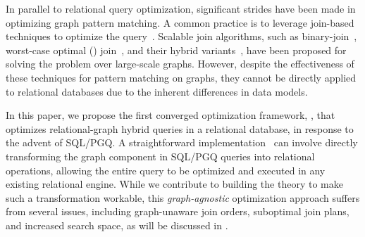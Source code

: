 In parallel to relational query optimization, significant strides have been made in optimizing graph pattern matching.
A common practice is to
leverage join-based techniques to optimize the query~\cite{lai2019distributed,lai2015scalable,ammar2018distributed,huge}. Scalable join algorithms, such as binary-join~\cite{lai2015scalable}, worst-case optimal () join~\cite{ammar2018distributed}, and their hybrid variants~\cite{mhedhbi2019optimizing,huge,GLogS}, have been proposed for solving the problem over large-scale graphs. However, despite the effectiveness of these techniques for pattern matching on graphs, they cannot be directly applied to relational databases due to the inherent differences in data models.

In this paper, we propose the first converged optimization framework, \name, that optimizes relational-graph hybrid queries in a relational database, in response to the advent of SQL/PGQ. A straightforward implementation~\cite{DuckPGQ,DuckPGQ-VLDB,apache-age} can involve directly transforming the graph component in SQL/PGQ queries into relational operations, allowing the entire query to be optimized and executed in any existing relational engine. While we contribute to building the theory to make such a transformation workable, this \emph{graph-agnostic} optimization approach suffers from several issues, including graph-unaware join orders, suboptimal join plans, and increased search space, as will be discussed in .


